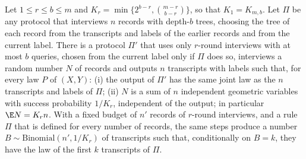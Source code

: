 \begin{theorem}\label{thm:simulation}
Let $1\le r\le b\le m$ and $K_r=\min\{2^{b-r},\binom{m-r}{b-r}\}$, so that
$K_1=K_{m,b}$. Let $\Pi$ be any protocol that interviews $n$ records with
depth-$b$ trees, choosing the tree of each record from the transcripts and
labels of the earlier records and from the current label. There is a protocol
$\Pi'$ that uses only $r$-round interviews with at most $b$ queries, chosen
from the current label only if $\Pi$ does so, interviews a random number $N$
of records and outputs $n$ transcripts with labels such that, for every law
$P$ of $(X,Y)$:
\textup{(i)} the output of $\Pi'$ has the same joint law as the $n$
transcripts and labels of $\Pi$;
\textup{(ii)} $N$ is a sum of $n$ independent geometric variables with
success probability $1/K_r$, independent of the output; in particular
$\E N=K_rn$.
With a fixed budget of $n'$ records of $r$-round interviews, and a rule $\Pi$
that is defined for every number of records, the same steps produce a number
$B\sim\mathrm{Binomial}(n',1/K_r)$ of transcripts such that, conditionally on
$B=k$, they have the law of the first $k$ transcripts of $\Pi$.
\end{theorem}
